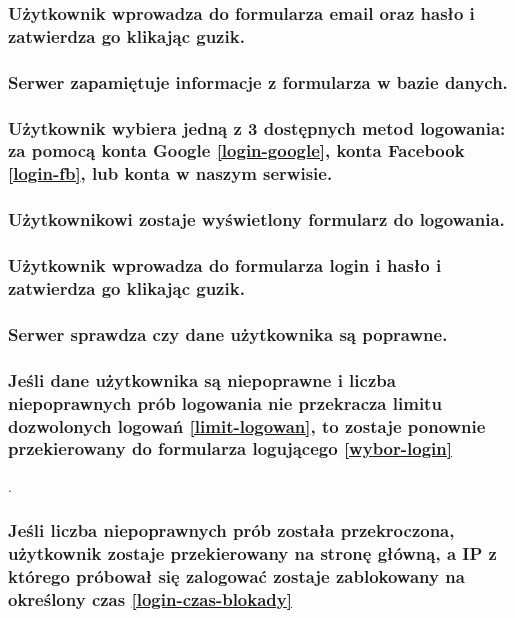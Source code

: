 \documentclass[a4paper]{article}
\begin{document}
\subsubsection{Użytkownik wprowadza do formularza email oraz hasło i zatwierdza go klikając guzik.}

\subsubsection{Serwer zapamiętuje informacje z formularza w bazie danych.}

\subsubsection{Użytkownik wybiera jedną z 3 dostępnych metod logowania: za pomocą konta Google \ref{login-google}, konta Facebook \ref{login-fb}, lub konta w naszym serwisie. \label{wybor-login}}

\subsubsection{Użytkownikowi zostaje wyświetlony formularz do logowania.}

\subsubsection{Użytkownik wprowadza do formularza login i hasło i zatwierdza go klikając guzik.}

\subsubsection{Serwer sprawdza czy dane użytkownika są poprawne.}

\subsubsection{Jeśli dane użytkownika są niepoprawne i liczba niepoprawnych prób logowania nie przekracza limitu dozwolonych logowań \ref{limit-logowan}, to zostaje ponownie przekierowany do formularza logującego \ref{wybor-login}}.

\subsubsection{Jeśli liczba niepoprawnych prób została przekroczona, użytkownik zostaje przekierowany na stronę główną, a IP z którego próbował się zalogować zostaje zablokowany na określony czas \ref{login-czas-blokady}}
\end{document}
